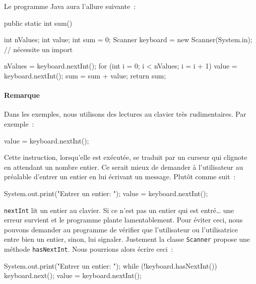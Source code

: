 		Le programme Java aura l'allure suivante~:

		\begin{java}
public static int sum(){
	int nValues;
	int value;
	int sum = 0;
	Scanner keyboard = new Scanner(System.in); // nécessite un import
	
	nValues = keyboard.nextInt();
	for  (int i = 0; i < nValues; i = i + 1){
		value = keyboard.nextInt();
		sum = sum + value;
	}
	return sum;
}
		\end{java}


		\paragraph{Remarque}

		Dans les exemples, nous utilisons des lectures au clavier très
		rudimentaires. Par exemple~:

		\begin{java}
value = keyboard.nextInt();			
		\end{java}

		Cette instruction, lorsqu'elle est exécutée, se traduit par un curseur
		qui clignote en attendant un nombre entier. Ce serait mieux de
		demander à l'utilisateur au préalable d'entrer un entier en lui écrivant
		un message. Plutôt comme suit~:

		\begin{java}
System.out.print("Entrer un entier: ");			
value = keyboard.nextInt();			
		\end{java}

		\texttt{nextInt} lit un entier au clavier. Si ce n'est pas un entier qui
		est entré… une erreur survient et le programme plante lamentablement.
		Pour éviter ceci, nous pouvons demander au programme de vérifier que
		l'utilisateur ou l'utilisatrice entre bien un entier, sinon, lui
		signaler. Justement la classe \texttt{Scanner} propose une méthode
		\texttt{hasNextInt}. Nous pourrions alors écrire ceci~:

		\begin{java}
System.out.print("Entrer un entier: ");			
while (!keyboard.hasNextInt()){
	keyboard.next();
}
value = keyboard.nextInt();						
		\end{java}

